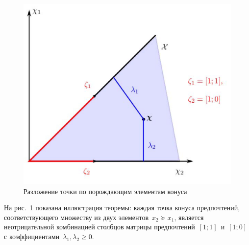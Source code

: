 \documentclass{elsarticle}
\newcommand{\bZ}{\mathbf{Z}}
\newcommand{\blambda}{\boldsymbol{\lambda}}
\newcommand{\cX}{\mathcal{X}}
\newtheorem{theorem}{Теорема}%
\begin{document}
\begin{figure}[h]
\begin{center}
\includegraphics[width=.6\textwidth]{coneTheorem.png}
\caption{Разложение точки по порождающим элементам конуса}
\label{fig:ConeTheorem}
\end{center}
\end{figure}
На рис.~\ref{fig:ConeTheorem} показана иллюстрация теоремы: каждая точка конуса предпочтений, соответствующего множеству из двух элементов~$x_2\succeq x_1$, является неотрицательной комбинацией столбцов матрицы предпочтений~$[1;1]$~и~$[1;0]$ с коэффициентами~$\lambda_1,\lambda_2\geq 0$.


\end{document}
